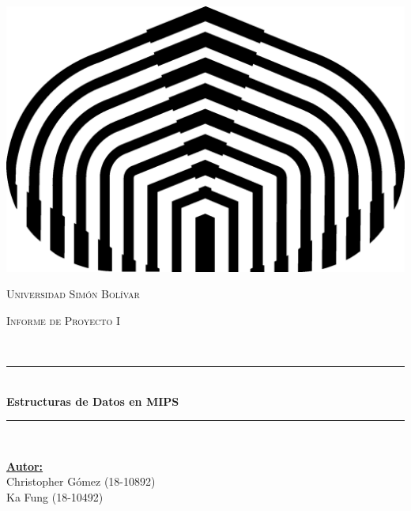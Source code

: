 \documentclass[11pt]{article}
\begin{document}

\begin{center} 
   \newcommand{\HRule}{\rule{\linewidth}{0.5mm}}  

   \begin{minipage}{0.48\textwidth}
      \begin{center}
         \includegraphics[scale = 0.5]{logo.png}
      \end{center}
   \end{minipage}

   \vspace*{1.0cm}                       
   \textsc{\huge Universidad Simón Bolívar} \\ [1.5cm] 

   \begin{minipage}{0.9\textwidth} 
      \begin{center}                                                             
         \textsc{\LARGE Informe de Proyecto I }
      \end{center}
   \end{minipage} \\ [3cm]

   \vspace*{1cm}                                                                              
   \HRule \\ [0.4cm]                                                  
   {\huge \bfseries Estructuras de Datos en MIPS} \\ [0.4cm] 
   \HRule \\ [4cm]

   \begin{minipage}{\textwidth} 
      \begin{flushleft} \large    
         \textbf{\underline{Autor:}} \\ 
         Christopher Gómez (18-10892)\\
         Ka Fung (18-10492)\\
      \end{flushleft}
   \end{minipage}


\end{center}
\end{document}
